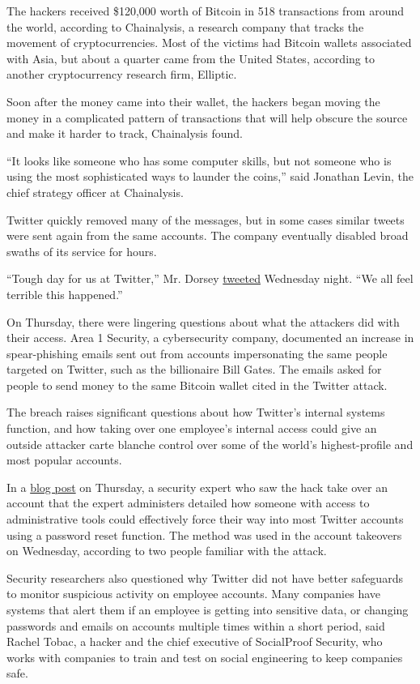 The hackers received \$120,000 worth of Bitcoin in 518 transactions from
around the world, according to Chainalysis, a research company that
tracks the movement of cryptocurrencies. Most of the victims had Bitcoin
wallets associated with Asia, but about a quarter came from the United
States, according to another cryptocurrency research firm, Elliptic.

Soon after the money came into their wallet, the hackers began moving
the money in a complicated pattern of transactions that will help
obscure the source and make it harder to track, Chainalysis found.

``It looks like someone who has some computer skills, but not someone
who is using the most sophisticated ways to launder the coins,'' said
Jonathan Levin, the chief strategy officer at Chainalysis.

Twitter quickly removed many of the messages, but in some cases similar
tweets were sent again from the same accounts. The company eventually
disabled broad swaths of its service for hours.

``Tough day for us at Twitter,'' Mr. Dorsey
\href{https://twitter.com/jack/status/1283571658339397632}{tweeted}
Wednesday night. ``We all feel terrible this happened.''

On Thursday, there were lingering questions about what the attackers did
with their access. Area 1 Security, a cybersecurity company, documented
an increase in spear-phishing emails sent out from accounts
impersonating the same people targeted on Twitter, such as the
billionaire Bill Gates. The emails asked for people to send money to the
same Bitcoin wallet cited in the Twitter attack.

The breach raises significant questions about how Twitter's internal
systems function, and how taking over one employee's internal access
could give an outside attacker carte blanche control over some of the
world's highest-profile and most popular accounts.

In a
\href{https://medium.com/@lucky225/the-twitter-hack-what-exactly-happened-d8740d33c1c}{blog
post} on Thursday, a security expert who saw the hack take over an
account that the expert administers detailed how someone with access to
administrative tools could effectively force their way into most Twitter
accounts using a password reset function. The method was used in the
account takeovers on Wednesday, according to two people familiar with
the attack.

Security researchers also questioned why Twitter did not have better
safeguards to monitor suspicious activity on employee accounts. Many
companies have systems that alert them if an employee is getting into
sensitive data, or changing passwords and emails on accounts multiple
times within a short period, said Rachel Tobac, a hacker and the chief
executive of SocialProof Security, who works with companies to train and
test on social engineering to keep companies safe.

